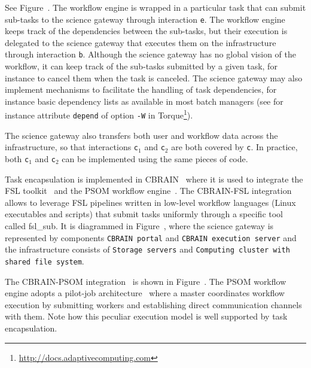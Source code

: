 \documentclass[preprint,3p,twocolumn]{elsarticle}
\begin{document}
See Figure~. The workflow engine is wrapped in
a particular task that can submit sub-tasks to the science gateway
through interaction \texttt{e}. The workflow engine keeps track of the
dependencies between the sub-tasks, but their execution is delegated
to the science gateway that executes them on the infrastructure
through interaction \texttt{b}. Although the science gateway has no
global vision of the workflow, it can keep track of the sub-tasks
submitted by a given task, for instance to cancel them when
the task is canceled. The science gateway may also implement
mechanisms to facilitate the handling of task dependencies, for
instance basic dependency lists as available in most batch managers
(see for instance attribute \texttt{depend} of option \texttt{-W} in
Torque\footnote{\url{http://docs.adaptivecomputing.com}}).

The science gateway also transfers both user and workflow data across
the infrastructure, so that interactions \texttt{c$_1$} and
\texttt{c$_2$} are both covered by \texttt{c}. In practice, both
\texttt{c$_1$} and \texttt{c$_2$} can be implemented using the same
pieces of code.

Task encapsulation is implemented in CBRAIN~\cite{SHER-14} where it is
used to integrate the FSL toolkit~\cite{Jenkinson2012782} and the PSOM
workflow engine~\cite{bellec2012pipeline}. The CBRAIN-FSL integration
allows to leverage FSL pipelines written in low-level workflow
languages (Linux executables and scripts) that submit tasks uniformly
through a specific tool called fsl\_sub. It is diagrammed in
Figure~, where the science gateway is
represented by components \texttt{CBRAIN portal} and \texttt{CBRAIN
  execution server} and the infrastructure consists of \texttt{Storage
  servers} and \texttt{Computing cluster with shared file system}.

The CBRAIN-PSOM integration~\cite{GLAT-16} is shown in
Figure~. The PSOM workflow engine
adopts a pilot-job architecture~\cite{turilli2015comprehensive} where
a master coordinates workflow execution by submitting workers and
establishing direct communication channels with them. Note how this
peculiar execution model is well supported by task encapsulation.
\end{document}
